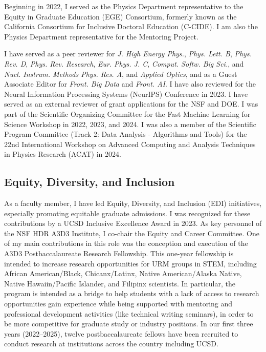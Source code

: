 \documentclass[11pt,letterpaper,notitlepage]{article}
\begin{document}
Beginning in 2022, I served as the Physics Department representative to the Equity in Graduate Education (EGE) Consortium, formerly known as the California Consortium for Inclusive Doctoral Education (C-CIDE).
I am also the Physics Department representative for the Mentoring Project.

I have served as a peer reviewer for \emph{J. High Energy Phys.}, \emph{Phys. Lett. B}, \emph{Phys. Rev. D}, \emph{Phys. Rev. Research}, \emph{Eur. Phys. J. C}, \emph{Comput. Softw. Big Sci.}, and \emph{Nucl. Instrum. Methods Phys. Res. A}, and \emph{Applied Optics}, and as a Guest Associate Editor for \emph{Front. Big Data} and \emph{Front. AI}.
I have also reviewed for the Neural Information Processing Systems (NeurIPS) Conference in 2023.
I have served as an external reviewer of grant applications for the NSF and DOE.
I was part of the Scientific Organizing Committee for the Fast Machine Learning for Science Workshop in 2022, 2023, and 2024.
I was also a member of the Scientific Program Committee (Track 2: Data Analysis - Algorithms and Tools) for the 22nd International Workshop on Advanced Computing and Analysis Techniques in Physics Research (ACAT) in 2024.

\vspace{-1ex}
\subsection*{Equity, Diversity, and Inclusion}

As a faculty member, I have led Equity, Diversity, and Inclusion (EDI) initiatives, especially promoting equitable graduate admissions.
I was recognized for these contributions by a UCSD Inclusive Excellence Award in 2023.
As key personnel of the NSF HDR A3D3 Institute, I co-chair the Equity and Career Committee.
One of my main contributions in this role was the conception and execution of the A3D3 Postbaccalaureate Research Fellowship.
This one-year fellowship is intended to increase research opportunities for URM groups in STEM, including African American/Black, Chicanx/Latinx, Native American/Alaska Native, Native Hawaiin/Pacific Islander, and Filipinx scientists.
In particular, the program is intended as a bridge to help students with a lack of access to research opportunities gain experience while being supported with mentoring and professional development activities (like technical writing seminars), in order to be more competitive for graduate study or industry positions.
In our first three years (2022--2025), twelve postbaccalaureate fellows have been recruited to conduct research at institutions across the country including UCSD.
\end{document}
